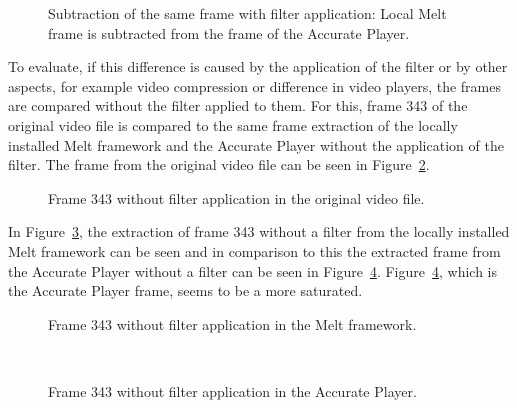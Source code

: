 \documentclass[../MasterThesis.tex]{subfiles}
\begin{document}
\begin{figure}[H]
	\begin{center}
		\caption[Subtraction of the two different frames (Accurate Player - Melt).]{Subtraction of the same frame with filter application: Local Melt frame is subtracted from the frame of the Accurate Player.}
		\label{figure:filterVSfilter}
	\end{center}
\end{figure}

To evaluate, if this difference is caused by the application of the filter or by other aspects, for example video compression or difference in video players, the frames are compared without the filter applied to them. For this, frame 343 of the original video file is compared to the same frame extraction of the locally installed Melt framework and the Accurate Player without the application of the filter. The frame from the original video file can be seen in Figure~\ref{figure:nofilterO}.

\begin{figure}[H]
	\begin{center}
		\caption[Frame 343 without filter application in the original video file.]{Frame 343 without filter application in the original video file.}
		\label{figure:nofilterO}
	\end{center}
\end{figure}


In Figure~\ref{figure:nofilterMelt}, the extraction of frame 343 without a filter from the locally installed Melt framework can be seen and in comparison to this the extracted frame from the Accurate Player without a filter can be seen in Figure~\ref{figure:nofilterAP}. Figure~\ref{figure:nofilterAP}, which is the Accurate Player frame, seems to be a more saturated.


\begin{minipage}{0.48\textwidth}
	\begin{figure}[H]
		\begin{center}
			\caption[Frame 343 without filter application in the Melt framework.]{Frame 343 without filter application in the Melt framework.}
			\label{figure:nofilterMelt}
		\end{center}
	\end{figure}
\end{minipage}\begin{minipage}{0.04\textwidth}
	\ 
\end{minipage}\begin{minipage}{0.48\textwidth}
	\begin{figure}[H]
		\begin{center}
			\caption[Frame 343 without filter application in the Accurate Player.]{Frame 343 without filter application in the Accurate Player.}
			\label{figure:nofilterAP}
		\end{center}
	\end{figure}
\end{minipage}
\end{document}
